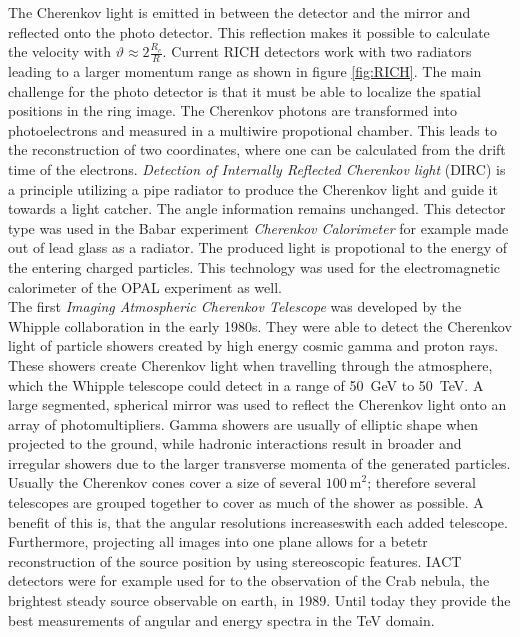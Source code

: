 The Cherenkov light is emitted in between the detector and the mirror and reflected onto the photo detector. This reflection makes it possible to calculate the velocity with $\vartheta \approx 2\frac{R_c}{R}$. Current RICH detectors work with two radiators leading to a larger momentum range as shown in figure \ref{fig:RICH}.
The main challenge for the photo detector is that it must be able to localize the spatial positions in the ring image. The Cherenkov photons are transformed into photoelectrons and measured in a multiwire propotional chamber. This leads to the reconstruction of two coordinates, where one can be calculated from the drift time of the electrons. \textit{Detection of Internally Reflected Cherenkov light} (DIRC) is a principle utilizing a pipe radiator to produce the Cherenkov light and guide it towards a light catcher. The angle information remains unchanged. This detector type was used in the Babar experiment \textit{Cherenkov Calorimeter} for example made out of lead glass as a radiator. The produced light is propotional to the energy of the entering charged particles. This technology was used for the electromagnetic calorimeter of the OPAL experiment as well.\\
The first \textit{Imaging Atmospheric Cherenkov Telescope} was developed by the Whipple collaboration in the early 1980s. They were able to detect the Cherenkov light of particle showers created by high energy cosmic gamma and proton rays. These showers create Cherenkov light when travelling through the atmosphere, which the Whipple telescope could detect in a range of \SI{50}{\giga\electronvolt} to \SI{50}{\tera\electronvolt}. A large segmented, spherical mirror was used to reflect the Cherenkov light onto an array of photomultipliers. Gamma showers are usually of elliptic shape when projected to the ground, while hadronic interactions result in broader and irregular showers due to the larger transverse momenta of the generated particles. Usually the Cherenkov cones cover a size of several $\SI{100}{\meter}^2$; therefore several telescopes are grouped together to cover as much of the shower as possible. A benefit of this is, that the angular resolutions increaseswith each added telescope. Furthermore, projecting all images into one plane allows for a betetr reconstruction of the source position by using stereoscopic features. IACT detectors were for example used for to the observation of the Crab nebula, the brightest steady source observable on earth, in 1989. Until today they provide the best measurements of angular and energy spectra in the \si{\tera\electronvolt} domain.\\
